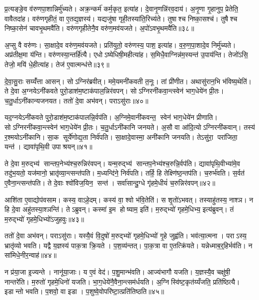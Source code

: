 प्र॒त्यङ्ङे॒व व॑रुणपा॒शान्निर्मु॑च्यते। अक्र॒न्कर्म॑ कर्म॒कृत॒ इत्या॑ह। दे॒वानृ॒णन्नि॑रव॒दाय॑। अ॒नृ॒णा गृ॒हानुप॒ प्रेतेति॒ वावैतदा॑ह। वरु॑णगृहीतं॒ वा ए॒तद्य॒ज्ञस्य॑। यद्यजु॑षा गृही॒तस्या॑ति॒रिच्य॑ते। तुषाश्च निष्का॒सश्च॑। तुषैश्च निष्का॒सेन॑ चावभृ॒थमवै॑ति। वरु॑णगृहीतेनै॒व वरु॑ण॒मव॑यजते। अ॒पो॑ऽवभृ॒थमवै॑ति॥३८॥

अ॒प्सु वै वरु॑णः। सा॒क्षादे॒व वरु॑ण॒मव॑यजते। प्रति॑युतो॒ वरु॑णस्य॒ पाश॒ इत्या॑ह। व॒रु॒ण॒पा॒शादे॒व निर्मु॑च्यते। अप्र॑तीक्ष॒मा य॑न्ति। वरु॑णस्या॒न्तर्\mbox{}हि॑त्यै। एधोऽष्येधिषी॒महीत्या॑ह। स॒मिधै॒वाग्निन्न॑म॒स्यन्त॑ उ॒पाय॑न्ति। तेजो॑ऽसि॒ तेजो॒ मयि॑ धे॒हीत्या॑ह। तेज॑ ए॒वात्मन्ध॑त्ते॥३९॥

दे॒वा॒सु॒राः सय्यँ॑त्ता आसन्। सोऽग्निर॑ब्रवीत्। ममे॒यमनी॑कवती त॒नूः। तां प्री॑णीत। अथासु॑रान॒भि भ॑विष्य॒थेति॑। ते दे॒वा अ॒ग्नयेऽनी॑कवते पुरो॒डाश॑म॒ष्टाक॑पाल॒न्निर॑वपन्। सोऽग्निरनी॑कवा॒न्त्स्वेन॑ भाग॒धेये॑न प्री॒तः। च॒तु॒र्धाऽनी॑कान्यजनयत। ततो॑ दे॒वा अभ॑वन्। पराऽसु॑राः॥४०॥

यद॒ग्नयेऽनी॑कवते पुरो॒डाश॑म॒ष्टाक॑पालन्नि॒र्वप॑ति। अ॒ग्निमे॒वानी॑कवन्त॒ स्वेन॑ भाग॒धेये॑न प्रीणाति। सोऽग्निरनी॑कवा॒न्त्स्वेन॑ भाग॒धेये॑न प्री॒तः। च॒तु॒र्धाऽनी॑कानि जनयते। अ॒सौ वा आ॑दि॒त्योऽग्निरनी॑कवान्। तस्य॑ र॒श्मयोऽनी॑कानि। सा॒क सूर्ये॑णोद्य॒ता निर्व॑पति। सा॒क्षादे॒वास्मा॒ अनी॑कानि जनयति। तेऽसु॑रा॒ परा॑जिता॒ यन्त॑। द्यावा॑पृथि॒वी उपाश्रयन्॥४१॥

ते दे॒वा म॒रुद्भ्य॑ सान्तप॒नेभ्य॑श्च॒रुन्निर॑वपन्। यन्म॒रुद्भ्य॑ सान्तप॒नेभ्य॑श्च॒रुन्नि॒र्वप॑ति। द्यावा॑पृथि॒वीभ्या॑मे॒व तदु॑भ॒यतो॒ यज॑मानो॒ भ्रातृ॑व्या॒न्त्सन्त॑पति। म॒ध्यन्दि॑ने॒ निर्व॑पति। तर्\mbox{}हि॒ हि तेक्ष्णि॑ष्ठ॒न्तप॑ति। च॒रुर्भ॑वति। स॒र्वत॑ ए॒वैना॒न्त्सन्त॑पति। ते दे॒वाः श्वो॑विज॒यिन॒ सन्त॑। सर्वा॑सान्दु॒ग्धे गृ॑हमे॒धीयं॑ च॒रुन्निर॑वपन्॥४२॥

आशि॑ता ए॒वाद्योप॑वसाम। कस्य॒ वाऽहे॒दम्। कस्य॑ वा॒ श्वो भ॑वि॒तेति॑। स शृ॒तो॑ऽभवत्। तस्याहु॑तस्य॒ नाश्ञ\sn{}। न हि दे॒वा अहु॑तस्या॒श्ञन्ति॑। तेऽब्रुवन्। कस्मा॑ इ॒म होष्याम॒ इति॑। म॒रुद्भ्यो॑ गृहमे॒धिभ्य॒ इत्य॑ब्रुवन्। तं म॒रुद्भ्यो॑ गृहमे॒धिभ्यो॑ऽजुहवुः॥४३॥

ततो॑ दे॒वा अभ॑वन्। पराऽसु॑राः। यस्यै॒वं वि॒दुषो॑ म॒रुद्भ्यो॑ गृहमे॒धिभ्यो॑ गृ॒हे जुह्व॑ति। भव॑त्या॒त्मना। पराऽस्य॒ भ्रातृ॑व्यो भवति। यद्वै य॒ज्ञस्य॑ पाक॒त्रा क्रि॒यते। प॒श॒व्य॑न्तत्। पा॒क॒त्रा वा ए॒तत्क्रि॑यते। यन्नेध्माब॒र्॒हिर्भव॑ति। न सा॑मिधे॒नीर॒न्वाह॑॥४४॥

न प्र॑या॒जा इ॒ज्यन्ते। नानू॑या॒जाः। य ए॒वं वेद॑। प॒शु॒मान्भ॑वति। आज्य॑भागौ यजति। य॒ज्ञस्यै॒व चक्षु॑षी॒ नान्तरे॑ति। म॒रुतो॑ गृहमे॒धिनो॑ यजति। भा॒ग॒धेये॑नै॒वैना॒न्त्सम॑र्धयति। अ॒ग्निस्वि॑ष्ट॒कृत॑य्यँजति॒ प्रति॑ष्ठित्यै। इडान्तो भवति। प॒शवो॒ वा इडा। प॒शुष्वे॒वोपरि॑ष्टा॒त्प्रति॑तिष्ठति॥४५॥

